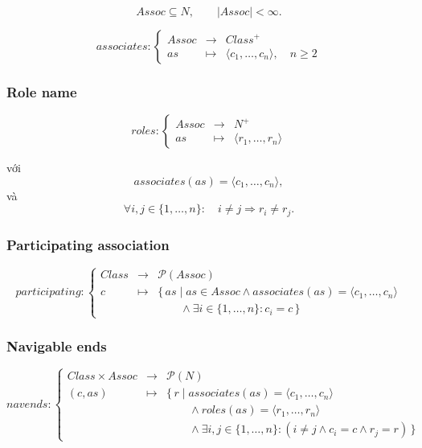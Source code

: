 \documentclass[12pt,a4paper]{article}
\theoremstyle{definition}
\begin{document}
\[
Assoc\subseteq N,
\qquad |Assoc|<\infty.
\]

\[
associates:
\left\{
\begin{array}{rcl}
Assoc & \to & Class^{+}\\
as & \mapsto & \langle c_1,\ldots,c_n\rangle,\quad n\geq2
\end{array}
\right.
\]


\subsubsection{Role name}

\[
roles:
\left\{
\begin{array}{rcl}
Assoc & \to & N^{+}\\
as & \mapsto & \langle r_1,\ldots,r_n\rangle
\end{array}
\right.
\]

với
\[
associates(as)=\langle c_1,\ldots,c_n\rangle,
\]
và
\[
\forall i,j\in\{1,\ldots,n\}:
\quad
i\neq j\Rightarrow r_i\neq r_j.
\]


\subsubsection{Participating association}

\[
participating:
\left\{
\begin{array}{rcl}
Class & \to & \mathcal{P}(Assoc)\\
c & \mapsto &
\{\,as\mid as\in Assoc
\land associates(as)=\langle c_1,\ldots,c_n\rangle
\\
&&
\qquad\land\exists i\in\{1,\ldots,n\}:c_i=c\,\}
\end{array}
\right.
\]


\subsubsection{Navigable ends}

\[
navends:
\left\{
\begin{array}{rcl}
Class\times Assoc & \to & \mathcal{P}(N)\\
(c,as) & \mapsto &
\{\,r\mid associates(as)=\langle c_1,\ldots,c_n\rangle
\\
&&
\qquad\land roles(as)=\langle r_1,\ldots,r_n\rangle
\\
&&
\qquad\land\exists i,j\in\{1,\ldots,n\}:
(i\neq j\land c_i=c\land r_j=r)\,\}
\end{array}
\right.
\]
\end{document}
